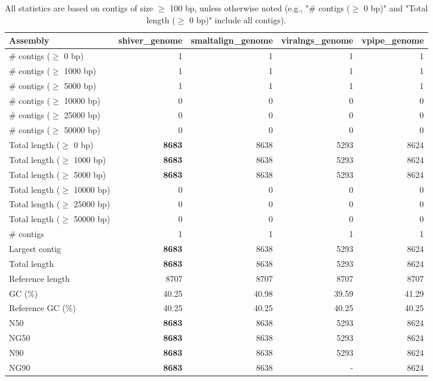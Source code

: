 \documentclass[12pt,a4paper]{article}
\begin{document}
\begin{table}[ht]
\begin{center}
\caption{All statistics are based on contigs of size $\geq$ 100 bp, unless otherwise noted (e.g., "\# contigs ($\geq$ 0 bp)" and "Total length ($\geq$ 0 bp)" include all contigs).}
\begin{tabular}{|l*{4}{|r}|}
\hline
Assembly & shiver\_genome & smaltalign\_genome & viralngs\_genome & vpipe\_genome \\ \hline
\# contigs ($\geq$ 0 bp) & 1 & 1 & 1 & 1 \\ \hline
\# contigs ($\geq$ 1000 bp) & 1 & 1 & 1 & 1 \\ \hline
\# contigs ($\geq$ 5000 bp) & 1 & 1 & 1 & 1 \\ \hline
\# contigs ($\geq$ 10000 bp) & 0 & 0 & 0 & 0 \\ \hline
\# contigs ($\geq$ 25000 bp) & 0 & 0 & 0 & 0 \\ \hline
\# contigs ($\geq$ 50000 bp) & 0 & 0 & 0 & 0 \\ \hline
Total length ($\geq$ 0 bp) & {\bf 8683} & 8638 & 5293 & 8624 \\ \hline
Total length ($\geq$ 1000 bp) & {\bf 8683} & 8638 & 5293 & 8624 \\ \hline
Total length ($\geq$ 5000 bp) & {\bf 8683} & 8638 & 5293 & 8624 \\ \hline
Total length ($\geq$ 10000 bp) & 0 & 0 & 0 & 0 \\ \hline
Total length ($\geq$ 25000 bp) & 0 & 0 & 0 & 0 \\ \hline
Total length ($\geq$ 50000 bp) & 0 & 0 & 0 & 0 \\ \hline
\# contigs & 1 & 1 & 1 & 1 \\ \hline
Largest contig & {\bf 8683} & 8638 & 5293 & 8624 \\ \hline
Total length & {\bf 8683} & 8638 & 5293 & 8624 \\ \hline
Reference length & 8707 & 8707 & 8707 & 8707 \\ \hline
GC (\%) & 40.25 & 40.98 & 39.59 & 41.29 \\ \hline
Reference GC (\%) & 40.25 & 40.25 & 40.25 & 40.25 \\ \hline
N50 & {\bf 8683} & 8638 & 5293 & 8624 \\ \hline
NG50 & {\bf 8683} & 8638 & 5293 & 8624 \\ \hline
N90 & {\bf 8683} & 8638 & 5293 & 8624 \\ \hline
NG90 & {\bf 8683} & 8638 & - & 8624 \\ \hline

\end{tabular}
\end{center}
\end{table}
\end{document}
